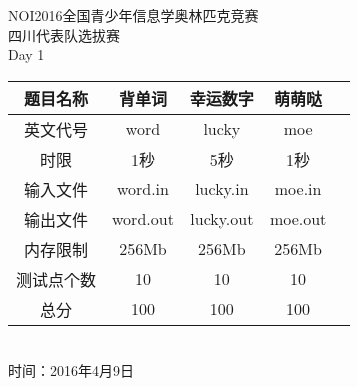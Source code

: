 \begin{center}
\xiaoyi\textsf{NOI2016全国青少年信息学奥林匹克竞赛}
~\\[120pt]
\chuhao\textsf{四川代表队选拔赛}
~\\[60pt]
\textsf{Day 1}
~\\[60pt]
\begin{spacing}{1.5}
\xiaoer
\begin{tabular}{|c|c|c|c|c|}
	\hline
	\textsf{题目名称}&\textsf{背单词}&\textsf{幸运数字}&\textsf{萌萌哒}\\
	\hline
	英文代号&word&lucky&moe\\
	\hline
	时限&1秒&5秒&1秒\\
	\hline
	输入文件&word.in&lucky.in&moe.in\\
	\hline
	输出文件&word.out&lucky.out&moe.out\\
	\hline
	内存限制&256Mb&256Mb&256Mb\\
	\hline
	测试点个数&10&10&10\\
	\hline
	总分&100&100&100\\
	\hline
\end{tabular}
\end{spacing}
~\\[40pt]
\erhao\textsf{时间：2016年4月9日}
\end{center}
